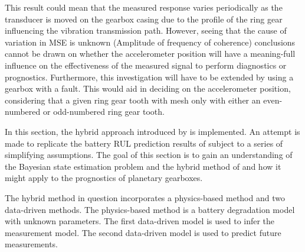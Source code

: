 This result could mean that the measured response varies periodically as the transducer is moved on the gearbox casing due to the profile of the ring gear influencing the vibration transmission path. However, seeing that the cause of variation in MSE is unknown (Amplitude of frequency of coherence) conclusions cannot be drawn on whether the accelerometer position will have a meaning-full influence on the effectiveness of the measured signal to perform diagnostics or prognostics. Furthermore, this investigation will have to be extended by using a gearbox with a fault. This would aid in deciding on the accelerometer position, considering that a given ring gear tooth with mesh only with either an even-numbered or odd-numbered ring gear tooth. 









In this section, the hybrid approach introduced by \cite{Liao2016} is implemented. An attempt is made to replicate the battery RUL prediction results of \cite{Liao2016} subject to a series of simplifying assumptions. The goal of this section is to gain an understanding of the Bayesian state estimation problem and the hybrid method of \cite{Liao2016} and how it might apply to the prognostics of planetary gearboxes.

The hybrid method in question incorporates a physics-based method and two data-driven methods. The physics-based method is a battery degradation model with unknown parameters. The first data-driven model is used to infer the measurement model. The second data-driven model is used to predict future measurements.


%




